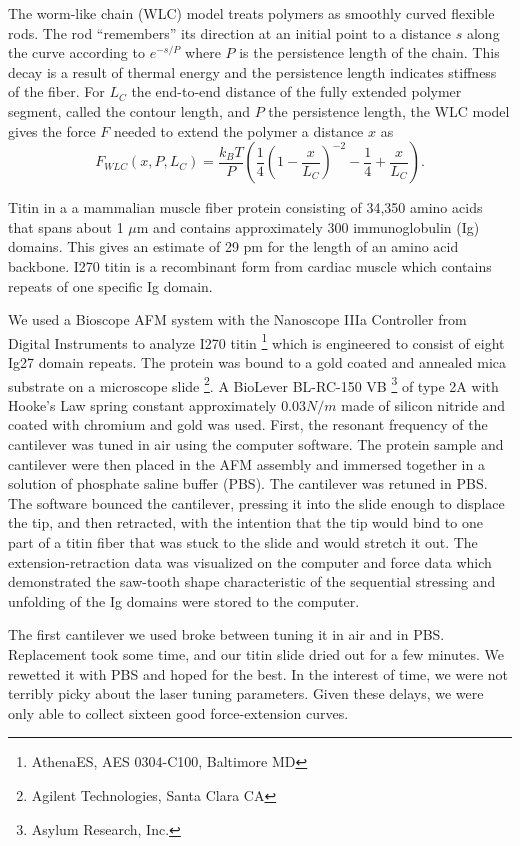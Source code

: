 \documentclass{article}
\begin{document}
The worm-like chain (WLC) model treats polymers as smoothly curved flexible rods.
The rod ``remembers'' its direction at an initial point to a distance $s$ along the curve
according to $e^{-s/P}$ where $P$ is the persistence length of the chain. This decay
is a result of thermal energy and the persistence length indicates stiffness of the fiber.
For $L_C$ the end-to-end distance of the fully extended polymer segment, called the
contour length, and $P$ the persistence length, the WLC model gives the force $F$ needed
to extend the polymer a distance $x$ as
\begin{equation}
F_{WLC}(x,P,L_C)=\frac{k_B T}{P} \left(\frac{1}{4}
\left(1-\frac{x}{L_C}\right)^{-2}-\frac{1}{4}
+\frac{x}{L_C}\right).
\end{equation}

Titin in a a mammalian muscle fiber protein consisting of 34,350 amino acids that spans
about 1 $\mu$m and contains approximately 300 immunoglobulin (Ig) domains. This gives
an estimate of 29 pm for the length of an amino acid backbone. I270 titin is
a recombinant form from cardiac muscle which contains repeats of one specific Ig domain.

We used a Bioscope AFM system with the Nanoscope IIIa Controller from Digital Instruments
to analyze I270 titin \footnote{AthenaES, AES 0304-C100, Baltimore MD} which is
engineered to consist of eight Ig27 domain repeats. The protein was bound to a gold coated 
and annealed mica substrate on a microscope slide \footnote{Agilent Technologies, Santa 
Clara CA}. A BioLever BL-RC-150 VB \footnote{Asylum Research, Inc.} of type 2A with
Hooke's Law spring constant approximately $0.03 N/m$ made of silicon nitride and
coated with chromium and gold was used. First, the resonant frequency of the cantilever
was tuned in air using the computer software. The protein sample and cantilever were
then placed in the AFM assembly and immersed together in a solution of phosphate saline
buffer (PBS). The cantilever was retuned in PBS. The software bounced the cantilever,
pressing it into the slide enough to displace the tip, and then retracted, with the intention
that the tip would bind to one part of a titin fiber that was stuck to the slide and would
stretch it out. The extension-retraction data was visualized on the computer and force data
which demonstrated the saw-tooth shape characteristic of the sequential stressing and
unfolding of the Ig domains were stored to the computer.

The first cantilever we used broke between tuning it in air and in PBS. Replacement took
some time, and our titin slide dried out for a few minutes. We rewetted it with
PBS and hoped for the best. In the interest of time, we were not terribly picky about the laser
tuning parameters. Given these delays, we were only able to collect sixteen good
force-extension curves.
\end{document}
